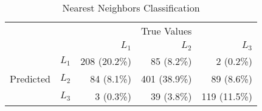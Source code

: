 \begin{table}
\centering
  \caption{Nearest Neighbors Classification}
  \begin{tabular}{rrrrr}
    \toprule
    & &\multicolumn{3}{c}{True Values}\\
    & & ${L_1}$ & ${L_2}$ & ${L_3}$ \\
    \multirow{3}{*}{Predicted} & ${L_1}$ & 208 (20.2\%) & 85 (8.2\%) & 2 (0.2\%) \\
    & ${L_2}$ & 84 (8.1\%) & 401 (38.9\%) & 89 (8.6\%) \\
    & ${L_3}$ & 3 (0.3\%) & 39 (3.8\%) & 119 (11.5\%) \\\bottomrule
  \end{tabular}
\end{table}
